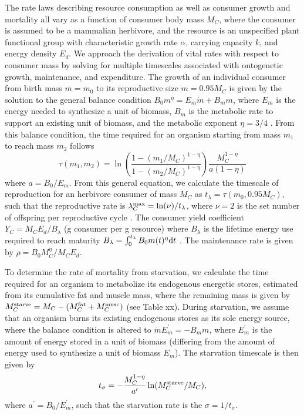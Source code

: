\documentclass[]{rsos}%
\begin{document}
The rate laws describing resource consumption as well as consumer growth and mortality all vary as a function of consumer body mass $M_C$, where the consumer is assumed to be a mammalian herbivore, and the resource is an unspecified plant functional group with characteristic growth rate $\alpha$, carrying capacity $k$, and energy density $E_d$. %
We approach the derivation of vital rates with respect to consumer mass by solving for multiple timescales associated with ontogenetic growth, maintenance, and expenditure.
The growth of an individual consumer from birth mass $m=m_0$ to its reproductive size $m=0.95M_C$ is given by the solution to the general balance condition $B_0 m^\eta = E_m \dot{m} + B_m m$, where $E_m$ is the energy needed to synthesize a unit of biomass, $B_m$ is the metabolic rate to support an existing unit of biomass, and the metabolic exponent $\eta=3/4$ \cite{West:2001bv}.
From this balance condition, the time required for an organism starting from mass $m_1$ to reach mass $m_2$ follows
\begin{equation}
    \tau(m_1,m_2) = \ln\left(\frac{1 - (m_1/M_C)^{1-\eta}}{1-(m_2/M_C)^{1-\eta}}\right)\frac{M_C^{1-\eta}}{a(1-\eta)}
\end{equation}
where $a = B_0/E_m$.
From this general equation, we calculate the timescale of reproduction for an herbivore consumer of mass $M_C$ as $t_\lambda = \tau(m_0,0.95M_C)$, such that the reproductive rate is $\lambda^{\rm max}_C = \ln(\nu)/t_\lambda$, where $\nu=2$ is the set number of offspring per reproductive cycle \cite{Savage2004,yeakel2018dynamics}.
The consumer yield coefficient $Y_C = M_C E_d/B_\lambda$ (g consumer per g resource) where $B_\lambda$ is the lifetime energy use required to reach maturity $B_\lambda = \int_0^{t_\lambda} B_0 m(t)^\eta {\rm d}t$ \cite{yeakel2018dynamics}.
The maintenance rate is given by $\rho = B_0 M_C^\eta/M_C E_d$.


To determine the rate of mortality from starvation, we calculate the time required for an organism to metabolize its endogenous energetic stores, estimated from its cumulative fat and muscle mass, where the remaining mass is given by $M_C^{\rm starve} = M_C - (M_C^{\rm fat} + M_C^{\rm musc})$ (see Table xx).
During starvation, we assume that an organism burns its existing endogenous stores as its sole energy source, where the balance condition is altered to $\dot{m}E^\prime_m = -B_m m$, where $E_m^\prime$ is the amount of energy stored in a unit of biomass (differing from the amount of energy used to synthesize a unit of biomass $E_m$).
The starvation timescale is then given by
\begin{equation}
    t_\sigma = -\frac{M_C^{1-\eta}}{a^\prime}\ln(M_C^{\rm starve}/M_C),
\end{equation}
where $a^\prime = B_0/E^\prime_m$, such that the starvation rate is the $\sigma = 1/t_\sigma$.
\end{document}
